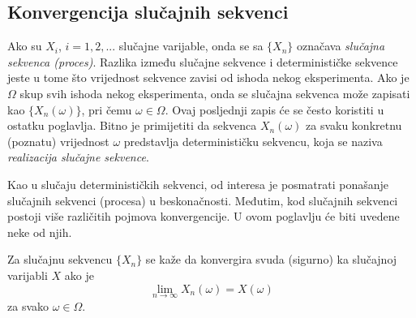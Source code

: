 \subsection{Konvergencija slučajnih sekvenci}

Ako su $X_i$, $i=1,2,...$ slučajne varijable, onda se sa $\{X_n\}$ označava
\textit{slučajna sekvenca (proces)}. Razlika između slučajne sekvence i
determinističke sekvence jeste u tome što vrijednost sekvence zavisi od ishoda
nekog eksperimenta.  Ako je $\Omega$ skup svih ishoda nekog eksperimenta, onda
se slučajna sekvenca može zapisati kao $\{X_n(\omega)\}$, pri čemu $\omega \in
\Omega$. Ovaj posljednji zapis će se često koristiti u ostatku poglavlja. Bitno
je primijetiti da sekvenca $X_n(\omega)$ za svaku konkretnu (poznatu) vrijednost
$\omega$ predstavlja determinističku sekvencu, koja se naziva
\textit{realizacija slučajne sekvence}.

Kao u slučaju determinističkih sekvenci, od interesa je posmatrati ponašanje
slučajnih sekvenci (procesa) u beskonačnosti. Međutim, kod slučajnih sekvenci
postoji više različitih pojmova konvergencije. U ovom poglavlju će biti uvedene
neke od njih. 

\begin{definition}
  Za slučajnu sekvencu $\{X_n\}$ se kaže da konvergira svuda (sigurno) ka
  slučajnoj varijabli $X$ ako je
  \begin{equation}
    \lim_{n\to\infty} X_n(\omega) = X(\omega)
  \end{equation}
  za svako $\omega \in \Omega$.
\end{definition}





